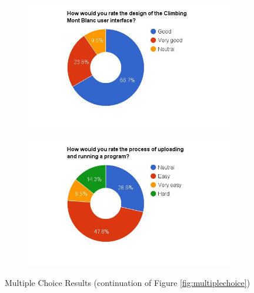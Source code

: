 \begin{figure}
    \hspace*{-1.5cm}
    \begin{subfigure}[h]{0.5\textwidth}
        \includegraphics[width=1.5\textwidth, height=1.0\textwidth]{results/design_cmb.jpg}
        \caption{}
        \label{fig:cmb-design}
    \end{subfigure}
    \hfill
    \begin{subfigure}[h]{0.5\textwidth}
        \includegraphics[width=1.5\textwidth, height=1.0\textwidth]{results/submission_cmb.jpg}
        \caption{}
        \label{fig:cmb-submission}
    \end{subfigure}
    \caption{Multiple Choice Results (continuation of Figure \ref{fig:multiplechoice})}
    \label{fig:multiplechoice1}
\end{figure}

